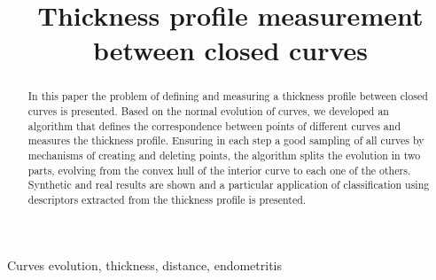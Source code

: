 \documentclass{article}
\title{Thickness profile measurement between closed curves}
\begin{document}
\maketitle

\begin{abstract}
In this paper the problem of defining and measuring a thickness profile between closed curves is presented. Based on the normal evolution of curves, we developed an algorithm that defines the correspondence between points of different curves and measures the thickness profile. Ensuring in each step a good sampling of all curves by mechanisms of creating and deleting points, the algorithm splits the evolution in two parts, evolving from the convex hull of the interior curve to each one of the others. Synthetic and real results are shown and a particular application of classification using descriptors extracted from the thickness profile is presented.
\end{abstract}

\begin{keywords}
Curves evolution, thickness, distance, endometritis
\end{keywords}
\end{document}
